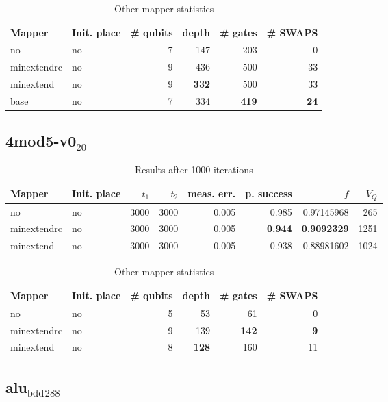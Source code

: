 \documentclass[11pt]{article}
\begin{document}
\begin{table}[!htpb]
\caption{\label{tab:org9e68a81}
Other mapper statistics}
\centering
\small
\begin{tabular}{llrrrr}
\hline
Mapper & Init. place & \# qubits & depth & \# gates & \# SWAPS\\
\hline
no & no & 7 & 147 & 203 & 0\\
\hline
minextendrc & no & 9 & 436 & 500 & 33\\
minextend & no & 9 & \textbf{332} & 500 & 33\\
base & no & 7 & 334 & \textbf{419} & \textbf{24}\\
\hline
\end{tabular}
\end{table}

\subsection{4mod5-v0\(_{\text{20}}\)}
\label{sec:org7e4e40c}
\begin{table}[!htpb]
\caption{\label{tab:orge73af54}
Results after 1000 iterations}
\centering
\begin{tabular}{llrrrrrr}
\hline
Mapper & Init. place & \(t_1\) & \(t_2\) & meas. err. & p. success & \(f\) & \(V_Q\)\\
\hline
no & no & 3000 & 3000 & 0.005 & 0.985 & 0.97145968 & 265\\
\hline
minextendrc & no & 3000 & 3000 & 0.005 & \textbf{0.944} & \textbf{0.9092329} & 1251\\
minextend & no & 3000 & 3000 & 0.005 & 0.938 & 0.88981602 & 1024\\
\hline
\end{tabular}
\end{table}

\begin{table}[!htpb]
\caption{\label{tab:org0824637}
Other mapper statistics}
\centering
\small
\begin{tabular}{llrrrr}
\hline
Mapper & Init. place & \# qubits & depth & \# gates & \# SWAPS\\
\hline
no & no & 5 & 53 & 61 & 0\\
\hline
minextendrc & no & 9 & 139 & \textbf{142} & \textbf{9}\\
minextend & no & 8 & \textbf{128} & 160 & 11\\
\hline
\end{tabular}
\end{table}
\subsection{alu\(_{\text{bdd}}\)\(_{\text{288}}\)}
\label{sec:orgf55e6d4}
\end{document}
